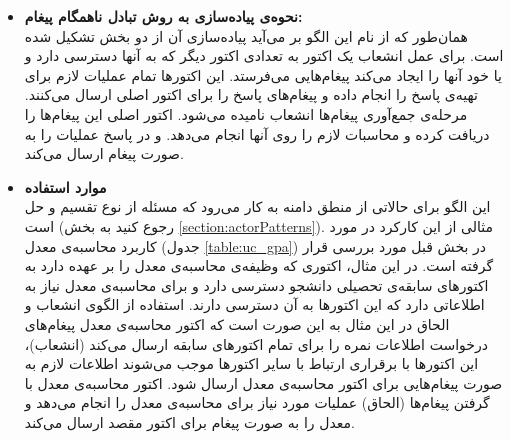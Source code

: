\begin{itemize}
\item\textbf{نحوه‌ی پیاده‌سازی به روش تبادل ناهمگام پیغام:}\\
همان‌طور که از نام این الگو بر می‌آید پیاده‌سازی آن از دو بخش تشکیل شده است. برای عمل انشعاب یک اکتور به تعدادی اکتور دیگر که به آنها دسترسی دارد و یا خود آنها را ایجاد می‌کند پیغام‌هایی می‌فرستد. این اکتورها تمام عملیات لازم برای تهیه‌ی پاسخ را انجام داده و پیغام‌های پاسخ را برای اکتور اصلی ارسال می‌کنند. مرحله‌ی جمع‌آوری پیغام‌ها انشعاب نامیده می‌شود. اکتور اصلی این پیغام‌‌ها را دریافت کرده و محاسبات لازم را روی آنها انجام می‌دهد. و در پاسخ عملیات را به صورت پیغام ارسال می‌کند.

\item\textbf{موارد استفاده}\\
این الگو برای حالاتی از منطق دامنه به کار می‌رود که مسئله از نوع تقسیم و حل است (رجوع کنید به بخش \ref{section:actorPatterns}). مثالی از این کارکرد در مورد کاربرد محاسبه‌ی معدل (جدول \ref{table:uc_gpa}) در بخش قبل مورد بررسی قرار گرفته است. در این مثال، اکتوری که وظیفه‌ی محاسبه‌ی معدل را بر عهده دارد به اکتورهای سابقه‌ی تحصیلی دانشجو دسترسی دارد و برای محاسبه‌ی معدل نیاز به اطلاعاتی دارد که این اکتورها به آن دسترسی دارند. استفاده از الگوی انشعاب و الحاق در این مثال به این صورت است که اکتور محاسبه‌ی معدل پیغام‌های درخواست اطلاعات نمره را برای تمام اکتورهای سابقه ارسال می‌کند (انشعاب)، این اکتورها با برقراری ارتباط با سایر اکتورها موجب می‌شوند اطلاعات لازم به صورت پیغام‌هایی برای اکتور محاسبه‌ی معدل ارسال شود. اکتور محاسبه‌ی معدل با گرفتن پیغام‌ها (الحاق) عملیات مورد نیاز برای محاسبه‌ی معدل را انجام‌ می‌دهد و معدل را به صورت پیغام برای اکتور مقصد ارسال می‌کند.


\end{itemize}

